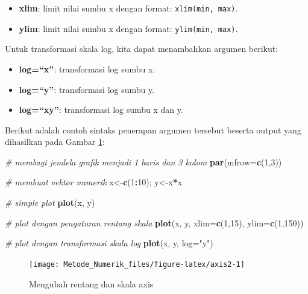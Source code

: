 \documentclass[
]{book}
\newenvironment{Shaded}{\begin{snugshade}}{\end{snugshade}}
\newcommand{\AttributeTok}[1]{\textcolor[rgb]{0.13,0.29,0.53}{#1}}
\newcommand{\CommentTok}[1]{\textcolor[rgb]{0.56,0.35,0.01}{\textit{#1}}}
\newcommand{\DecValTok}[1]{\textcolor[rgb]{0.00,0.00,0.81}{#1}}
\newcommand{\FunctionTok}[1]{\textcolor[rgb]{0.13,0.29,0.53}{\textbf{#1}}}
\newcommand{\NormalTok}[1]{#1}
\newcommand{\OtherTok}[1]{\textcolor[rgb]{0.56,0.35,0.01}{#1}}
\newcommand{\SpecialCharTok}[1]{\textcolor[rgb]{0.81,0.36,0.00}{\textbf{#1}}}
\newcommand{\StringTok}[1]{\textcolor[rgb]{0.31,0.60,0.02}{#1}}
\providecommand{\tightlist}{%
  \setlength{\itemsep}{0pt}\setlength{\parskip}{0pt}}
\theoremstyle{definition}
\theoremstyle{definition}
\theoremstyle{definition}
\theoremstyle{definition}
\theoremstyle{remark}
\begin{document}
\begin{itemize}
\tightlist
\item
  \textbf{xlim}: limit nilai sumbu x dengan format: \texttt{xlim(min,\ max)}.
\item
  \textbf{ylim}: limit nilai sumbu x dengan format: \texttt{ylim(min,\ max)}.
\end{itemize}

Untuk transformasi skala log, kita dapat menambahkan argumen berikut:

\begin{itemize}
\tightlist
\item
  \textbf{log=``x''}: transformasi log sumbu x.
\item
  \textbf{log=``y''}: transformasi log sumbu y.
\item
  \textbf{log=``xy''}: transformasi log sumbu x dan y.
\end{itemize}

Berikut adalah contoh sintaks penerapan argumen tersebut beserta output yang dihasilkan pada Gambar \ref{fig:axis2}:

\begin{Shaded}
\begin{Highlighting}[]
\CommentTok{\# membagi jendela grafik menjadi 1 baris dan 3 kolom}
\FunctionTok{par}\NormalTok{(}\AttributeTok{mfrow=}\FunctionTok{c}\NormalTok{(}\DecValTok{1}\NormalTok{,}\DecValTok{3}\NormalTok{))}

\CommentTok{\# membuat vektor numerik}
\NormalTok{x}\OtherTok{\textless{}{-}}\FunctionTok{c}\NormalTok{(}\DecValTok{1}\SpecialCharTok{:}\DecValTok{10}\NormalTok{); y}\OtherTok{\textless{}{-}}\NormalTok{x}\SpecialCharTok{*}\NormalTok{x}

\CommentTok{\# simple plot}
\FunctionTok{plot}\NormalTok{(x, y)}

\CommentTok{\# plot dengan pengaturan rentang skala}
\FunctionTok{plot}\NormalTok{(x, y, }\AttributeTok{xlim=}\FunctionTok{c}\NormalTok{(}\DecValTok{1}\NormalTok{,}\DecValTok{15}\NormalTok{), }\AttributeTok{ylim=}\FunctionTok{c}\NormalTok{(}\DecValTok{1}\NormalTok{,}\DecValTok{150}\NormalTok{))}

\CommentTok{\# plot dengan transformasi skala log}
\FunctionTok{plot}\NormalTok{(x, y, }\AttributeTok{log=}\StringTok{"y"}\NormalTok{)}
\end{Highlighting}
\end{Shaded}

\begin{figure}

{\centering \texttt{[image: Metode\_Numerik\_files/figure-latex/axis2-1]} 

}

\caption{Mengubah rentang dan skala axis}\label{fig:axis2}
\end{figure}
\end{document}
